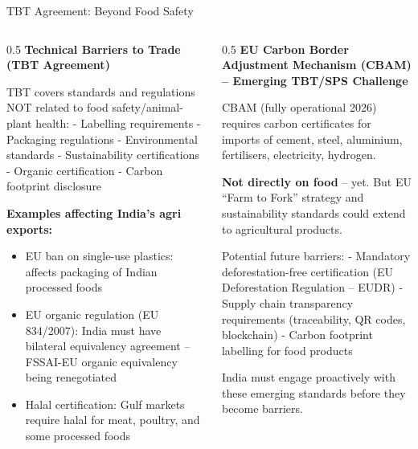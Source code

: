 \documentclass[
  ignorenonframetext,
  aspectratio=169,
]{beamer}
\makeatletter
\providecommand{\tightlist}{%
  \setlength{\itemsep}{0pt}\setlength{\parskip}{0pt}}
\let\quarto@originallabel\label
\DeclareRobustCommand*{\label}[1]{\quarto@originallabel{#1}}
\makeatother
\begin{document}
\begin{frame}{TBT Agreement: Beyond Food Safety}
\label{tbt-agreement-beyond-food-safety}
\begin{columns}[T]
\begin{column}{0.5\linewidth}
\textbf{Technical Barriers to Trade (TBT Agreement)}

TBT covers standards and regulations NOT related to food
safety/animal-plant health: - Labelling requirements - Packaging
regulations - Environmental standards - Sustainability certifications -
Organic certification - Carbon footprint disclosure

\textbf{Examples affecting India's agri exports:}

\begin{itemize}
\tightlist
\item
  EU ban on single-use plastics: affects packaging of Indian processed
  foods
\item
  EU organic regulation (EU 834/2007): India must have bilateral
  equivalency agreement -- FSSAI-EU organic equivalency being
  renegotiated
\item
  Halal certification: Gulf markets require halal for meat, poultry, and
  some processed foods
\end{itemize}
\end{column}

\begin{column}{0.5\linewidth}
\textbf{EU Carbon Border Adjustment Mechanism (CBAM) -- Emerging TBT/SPS
Challenge}

CBAM (fully operational 2026) requires carbon certificates for imports
of cement, steel, aluminium, fertilisers, electricity, hydrogen.

\textbf{Not directly on food} -- yet. But EU ``Farm to Fork'' strategy
and sustainability standards could extend to agricultural products.

Potential future barriers: - Mandatory deforestation-free certification
(EU Deforestation Regulation -- EUDR) - Supply chain transparency
requirements (traceability, QR codes, blockchain) - Carbon footprint
labelling for food products

India must engage proactively with these emerging standards before they
become barriers.
\end{column}
\end{columns}
\end{frame}
\end{document}
